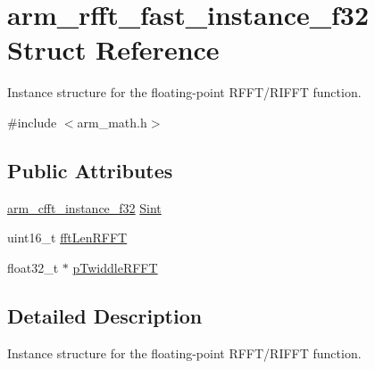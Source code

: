\hypertarget{structarm__rfft__fast__instance__f32}{\section{arm\-\_\-rfft\-\_\-fast\-\_\-instance\-\_\-f32 Struct Reference}
\label{structarm__rfft__fast__instance__f32}
}


Instance structure for the floating-\/point R\-F\-F\-T/\-R\-I\-F\-F\-T function.  




{\ttfamily \#include $<$arm\-\_\-math.\-h$>$}

\subsection*{Public Attributes}
\begin{DoxyCompactItemize}
\item 
\hyperlink{structarm__cfft__instance__f32}{arm\-\_\-cfft\-\_\-instance\-\_\-f32} \hyperlink{structarm__rfft__fast__instance__f32_a37419ababdfb3151b1891ae6bcd21012}{Sint}
\item 
uint16\-\_\-t \hyperlink{structarm__rfft__fast__instance__f32_aef06ab665041ec36f5b25d464f0cab14}{fft\-Len\-R\-F\-F\-T}
\item 
float32\-\_\-t $\ast$ \hyperlink{structarm__rfft__fast__instance__f32_a9f30b04f163fabc1b24421d3c323d5fc}{p\-Twiddle\-R\-F\-F\-T}
\end{DoxyCompactItemize}


\subsection{Detailed Description}
Instance structure for the floating-\/point R\-F\-F\-T/\-R\-I\-F\-F\-T function. 

